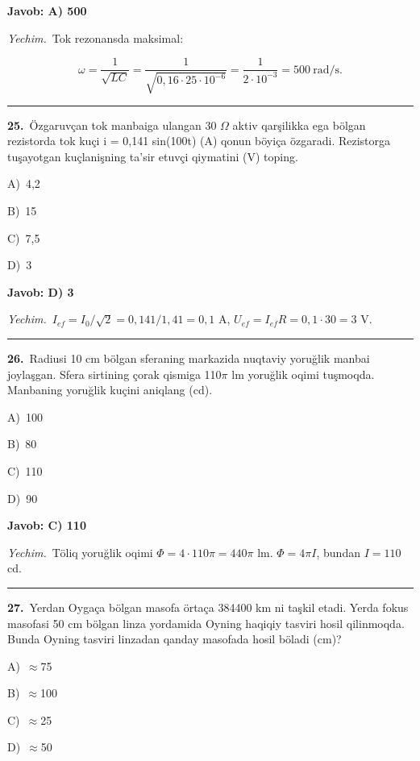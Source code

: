 \documentclass[11pt,a4paper]{article}
\newcommand{\opt}[2]{\hspace*{4mm}#1)\ #2\par}
\begin{document}
\noindent\colorbox{gray!12}{\parbox{\dimexpr\linewidth-2\fboxsep}{\textbf{Javob: A) 500}}}\par\smallskip
\noindent\textit{Yechim.}\ Tok rezonansda maksimal:\par
\[\omega=\frac{1}{\sqrt{LC}}=\frac{1}{\sqrt{0{,}16\cdot25\cdot10^{-6}}}=\frac{1}{2\cdot10^{-3}}=500\ \text{rad/s}.\]\par\medskip\hrule\medskip
{}\noindent\begin{minipage}{\linewidth}
\textbf{25.}\ Özgaruvçan tok manbaiga ulangan 30 $\Omega$ aktiv qarşilikka ega bölgan rezistorda tok kuçi i = 0,141 sin(100t) (A) qonun böyiça özgaradi. Rezistorga tuşayotgan kuçlanişning ta’sir etuvçi qiymatini (V) toping.\par\smallskip
\opt{A}{4,2}
\opt{B}{15}
\opt{C}{7,5}
\opt{D}{3}
\end{minipage}\vspace{2pt}\par
\noindent\colorbox{gray!12}{\parbox{\dimexpr\linewidth-2\fboxsep}{\textbf{Javob: D) 3}}}\par\smallskip
\noindent\textit{Yechim.}\ $I_{ef}=I_0/\sqrt2=0{,}141/1{,}41=0{,}1$ A, $U_{ef}=I_{ef}R=0{,}1\cdot30=3$ V.\par\par\medskip\hrule\medskip
{}\noindent\begin{minipage}{\linewidth}
\textbf{26.}\ Radiusi 10 cm bölgan sferaning markazida nuqtaviy yoruğlik manbai joylaşgan. Sfera sirtining çorak qismiga 110$\pi$ lm yoruğlik oqimi tuşmoqda. Manbaning yoruğlik kuçini aniqlang (cd).\par\smallskip
\opt{A}{100}
\opt{B}{80}
\opt{C}{110}
\opt{D}{90}
\end{minipage}\vspace{2pt}\par
\noindent\colorbox{gray!12}{\parbox{\dimexpr\linewidth-2\fboxsep}{\textbf{Javob: C) 110}}}\par\smallskip
\noindent\textit{Yechim.}\ Töliq yoruğlik oqimi $\Phi=4\cdot110\pi=440\pi$ lm. $\Phi=4\pi I$, bundan $I=110$ cd.\par\par\medskip\hrule\medskip
{}\noindent\begin{minipage}{\linewidth}
\textbf{27.}\ Yerdan Oygaça bölgan masofa örtaça 384400 km ni taşkil etadi. Yerda fokus masofasi 50 cm bölgan linza yordamida Oyning haqiqiy tasviri hosil qilinmoqda. Bunda Oyning tasviri linzadan qanday masofada hosil böladi (cm)?\par\smallskip
\opt{A}{$\approx$75}
\opt{B}{$\approx$100}
\opt{C}{$\approx$25}
\opt{D}{$\approx$50}
\end{minipage}\vspace{2pt}\par
\end{document}
